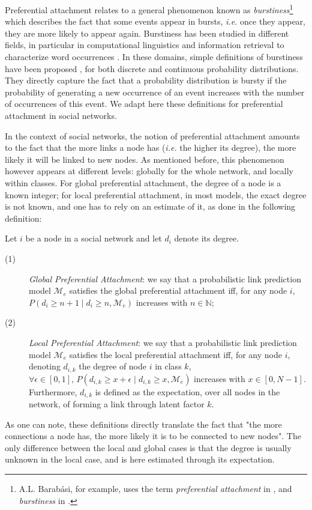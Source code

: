 \documentclass{llncs}
\newcommand{\pr}{P}
\begin{document}
Preferential attachment relates to a general phenomenon known as \textit{burstiness}\footnote{A.L. Barab\'asi, for example, uses the term \textit{preferential attachment} in \cite{barabasi1999emergence}, and \textit{burstiness} in \cite{barabasi_burst}.} which describes the fact that some events appear in bursts, \textit{i.e.} once they appear, they are more likely to appear again. Burstiness has been studied in different fields, in particular in computational linguistics and information retrieval to characterize word occurrences \cite{church1995poisson}. In these domains, simple definitions of burstiness have been proposed \cite{clinchant2008bnb,clinchant2010information}, for both discrete and continuous probability distributions. They directly capture the fact that a probability distribution is bursty if the probability of generating a new occurrence of an event increases with the number of occurrences of this event. We adapt here these definitions for preferential attachment in social networks.

In the context of social networks, the notion of preferential attachment amounts to the fact that the more links a node has (\textit{i.e.} the higher its degree), the more likely it will be linked to new nodes. As mentioned before, this phenomenon however appears at different levels: globally for the whole network, and locally within classes. For global preferential attachment, the degree of a node is a known integer; for local preferential attachment, in most models, the exact degree is not known, and one has to rely on an estimate of it, as done in the following definition:
%
\begin{definition}
Let $i$ be a node in a social network and let $d_i$ denote its degree. 
\begin{description}
 \item[(1)] \emph{Global Preferential Attachment}: we say that a probabilistic link prediction model $\mathcal{M}_e$ satisfies the global preferential attachment iff, for any node $i$, $\pr(d_i \ge n+1 \mid d_i \ge n, \mathcal{M}_e)$ increases with $n \in \mathbb{N}$;
 \item[(2)] \emph{Local Preferential Attachment}: we say that a probabilistic link prediction model $\mathcal{M}_e$ satisfies the local preferential attachment iff, for any node $i$, denoting $d_{i,k}$ the degree of node $i$ in class $k$, $\forall \epsilon \in [0,1], \, \pr(d_{i,k} \ge x+\epsilon \mid d_{i,k} \ge x, \mathcal{M}_e)$ increases with $x \in [0,N-1]$. Furthermore, $d_{i,k}$ is defined as the expectation, over all nodes in the network, of forming a link through latent factor $k$.
\end{description}
\label{def:burst-soc-net}
\end{definition}
%
As one can note, these definitions directly translate the fact that "the more connections a node has, the more likely it is to be connected to new nodes". The only difference between the local and global cases is that the degree is usually unknown in the local case, and is here estimated through its expectation.
\end{document}
